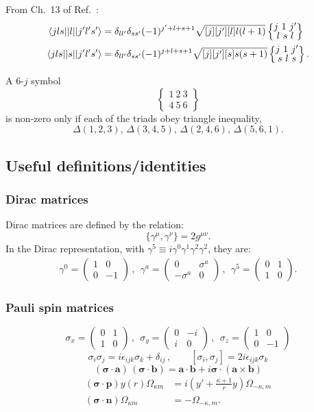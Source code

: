 \documentclass[10pt,twocolumn,a4paper]{article}%
\newcommand{\bra}[1]{\ensuremath{\langle #1|}}	%
\newcommand{\ket}[1]{\ensuremath{|#1\rangle}}	%
\newcommand{\matr}[4]{\ensuremath{\begin{pmatrix}#1&#2\\#3&#4\end{pmatrix}}}	%
\newcommand{\sixjs}[6]{\renewcommand\arraystretch{0.75}\ensuremath{\begin{Bmatrix}#1~#2~#3\\#4~#5~#6\end{Bmatrix}}}	%
\renewcommand{\v}[1]{\ensuremath{\boldsymbol{#1}}}		%
\newcommand{\be}{\begin{equation}}
\newcommand{\ee}{\end{equation}}
\newcommand{\g}{\ensuremath{\gamma}}
\newcommand{\s}{\ensuremath{\sigma}}
\renewcommand{\k}{\ensuremath{\kappa}}
\begin{document}
From Ch.~13 of Ref.~\cite{Varshalovich1988}:
\begin{align}\notag
\bra{jls}|l|\ket{j'l's'}& =\delta_{ll'}\delta_{ss'}(-1)^{j'+l+s+1}\sqrt{[j][j'][l]l(l+1)}\sixjs{j}{1}{j'}{l}{s}{l}\\
\bra{jls}|s|\ket{j'l's'}&= \delta_{ll'}\delta_{ss'}(-1)^{j+l+s+1}\sqrt{[j][j'][s]s(s+1)}\sixjs{j}{1}{j'}{s}{l}{s}.
\end{align}


A 6-$j$ symbol
\be
\sixjs{1}{2}{3}{4}{5}{6}
\ee
is non-zero only if each of the triads obey triangle inequality,
\be
\Delta(1,2,3),\, \Delta(3,4,5),\, \Delta(2,4,6),\, \Delta(5,6,1).
\ee



\subsection{Useful definitions/identities}

\subsubsection*{Dirac matrices}\label{sec:DiracMatrix}

Dirac matrices are defined by the relation:
\be
\{\g^\mu,\g^\nu\} = 2g^{\mu\nu}.
\ee
In the Dirac representation, with $\g^5 \equiv i\g^0\g^1\g^2\g^2$, they are:
\begin{multline}
\g^0 = \matr{1}{0}{0}{-1} \, , ~~
\g^a = \matr{0}{\s^a}{-\s^a}{0} \, , ~~
\g^5 = \matr{0}{1}{1}{0}.
\end{multline}

\subsubsection*{Pauli spin matrices}
\be
\s_x = \matr{0}{1}{1}{0} \, , ~~
\s_y = \matr{0}{-i}{i}{0} \, , ~~
\s_z = \matr{1}{0}{0}{-1}
\ee
\be
\s_i\s_j = i\epsilon_{ijk}\s_k + \delta_{ij} \, , \qquad
[\s_i,\s_j] = 2i\epsilon_{ijk}\s_k
\ee
\be
(\v{\s}\cdot\v{a})\,(\v{\s}\cdot\v{b}) = \v{a}\cdot\v{b} + i\v{\s}\cdot(\v{a}\times\v{b})
\ee
\begin{align}
(\v{\s}\cdot\v{p}) y(r)\Omega_{\k m} &= i\left(y' + \frac{\k+1}{r}y\right)\Omega_{-\k, m} \\
(\v{\s}\cdot\v{n}) \Omega_{\k m} &= -\Omega_{-\k, m}.
\end{align}
\end{document}
